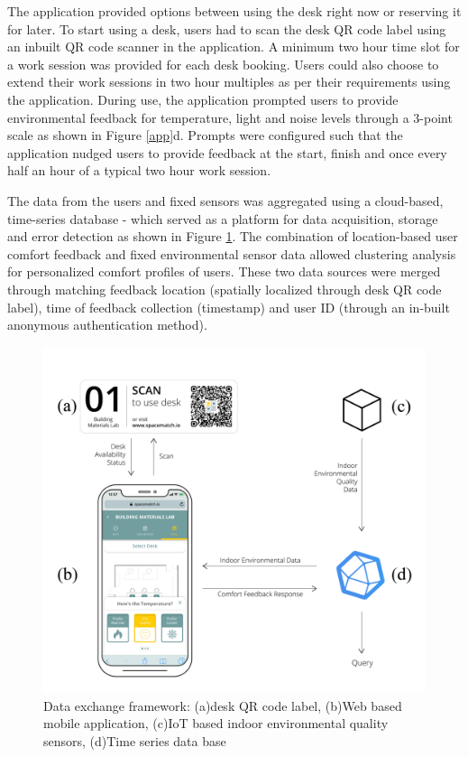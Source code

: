 \documentclass[]{interact}
\theoremstyle{plain}%
\theoremstyle{definition}
\theoremstyle{remark}
\begin{document}
The application provided options between using the desk right now or reserving it for later. To start using a desk, users had to scan the desk QR code label using an inbuilt QR code scanner in the application. A minimum two hour time slot for a work session was provided for each desk booking. Users could also choose to extend their work sessions in two hour multiples as per their requirements using the application. During use, the application prompted users to provide environmental feedback for temperature, light and noise levels through a 3-point scale as shown in Figure \ref{app}d. Prompts were configured such that the application nudged users to provide feedback at the start, finish and once every half an hour of a typical two hour work session. 


The data from the users and fixed sensors was aggregated using a cloud-based, time-series database - which served as a platform for data acquisition, storage and error detection as shown in Figure \ref{framework}. The combination of location-based user comfort feedback and fixed environmental sensor data allowed clustering analysis for personalized comfort profiles of users. These two data sources were merged through matching feedback location (spatially localized through desk QR code label), time of feedback collection (timestamp) and user ID (through an in-built anonymous authentication method).     

\begin{figure}[H]
\centering
\includegraphics[scale=0.1]{figures/framework.jpg}
\caption{Data exchange framework: (a)desk QR code label, (b)Web based mobile application, (c)IoT based indoor environmental quality sensors, (d)Time series data base} 
\label{framework}
\end{figure}
\end{document}
